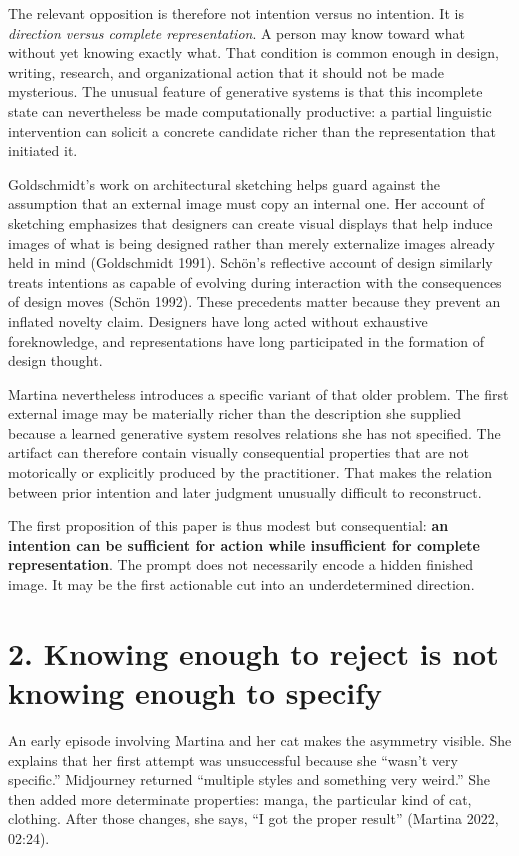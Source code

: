 \documentclass[
  11pt,
  letterpaper,
]{article}
\begin{document}
The relevant opposition is therefore not intention versus no intention.
It is \emph{direction versus complete representation}. A person may know
toward what without yet knowing exactly what. That condition is common
enough in design, writing, research, and organizational action that it
should not be made mysterious. The unusual feature of generative systems
is that this incomplete state can nevertheless be made computationally
productive: a partial linguistic intervention can solicit a concrete
candidate richer than the representation that initiated it.

Goldschmidt's work on architectural sketching helps guard against the
assumption that an external image must copy an internal one. Her account
of sketching emphasizes that designers can create visual displays that
help induce images of what is being designed rather than merely
externalize images already held in mind (Goldschmidt 1991). Schön's
reflective account of design similarly treats intentions as capable of
evolving during interaction with the consequences of design moves (Schön
1992). These precedents matter because they prevent an inflated novelty
claim. Designers have long acted without exhaustive foreknowledge, and
representations have long participated in the formation of design
thought.

Martina nevertheless introduces a specific variant of that older
problem. The first external image may be materially richer than the
description she supplied because a learned generative system resolves
relations she has not specified. The artifact can therefore contain
visually consequential properties that are not motorically or explicitly
produced by the practitioner. That makes the relation between prior
intention and later judgment unusually difficult to reconstruct.

The first proposition of this paper is thus modest but consequential:
\textbf{an intention can be sufficient for action while insufficient for
complete representation}. The prompt does not necessarily encode a
hidden finished image. It may be the first actionable cut into an
underdetermined direction.

\section{2. Knowing enough to reject is not knowing enough to
specify}\label{knowing-enough-to-reject-is-not-knowing-enough-to-specify}

An early episode involving Martina and her cat makes the asymmetry
visible. She explains that her first attempt was unsuccessful because
she ``wasn't very specific.'' Midjourney returned ``multiple styles and
something very weird.'' She then added more determinate properties:
manga, the particular kind of cat, clothing. After those changes, she
says, ``I got the proper result'' (Martina 2022, 02:24).
\end{document}
